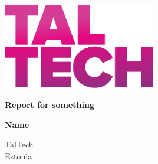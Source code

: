 \begin{titlepage}
    \begin{center}
        
        
        \includegraphics[width=0.5\textwidth]{dependancies/TTU_logo_fixed2.png}
        \vspace*{1cm}
        
        {
            \Large 
            \textbf{Report for something}
        }

        \vspace{1.5cm}
        {
            \large
            \textbf{Name} \\
        }
        \vfill


        \vspace{0.8cm}

        

        TalTech\\
        Estonia\\
        \the\year{}

    \end{center}
\end{titlepage}